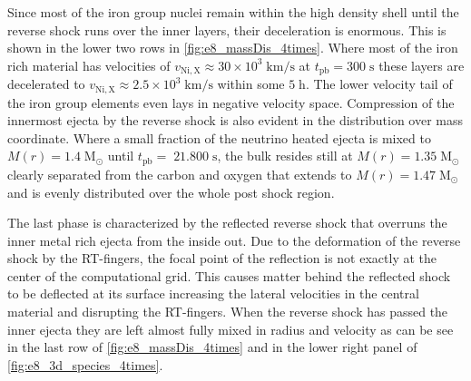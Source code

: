 \documentclass[fleqn,usenatbib]{mnras}
\begin{document}
Since most of the iron group nuclei remain within the high density shell until the reverse shock runs over the inner layers, their deceleration is enormous. This is shown in the lower two rows in \autoref{fig:e8_massDis_4times}. Where most of the iron rich material has velocities of $v_{\mathrm{Ni,X}}\approx 30\times10^3 \;\mathrm{km/s}$ at $t_{\mathrm{pb}}=300\;\mathrm{s}$ these layers are decelerated to $v_{\mathrm{Ni,X}}\approx 2.5\times 10^3\;\mathrm{km/s}$ within some $5 \;\mathrm{h}$. The lower velocity tail of the iron group elements even lays in negative velocity space. 
Compression of the innermost ejecta by the reverse shock is also evident in the distribution over mass coordinate. Where a small fraction of the neutrino heated ejecta is mixed to $M(r)=1.4\;\mathrm{M_{\odot}}$ until $t_{\mathrm{pb}}=\;21.800\;\mathrm{s}$, the bulk resides still at  $M(r)=1.35\;\mathrm{M_{\odot}}$ clearly separated from the carbon and oxygen that extends to $M(r)=1.47\;\mathrm{M_{\odot}}$ and is evenly distributed over the whole post shock region.

The last phase is characterized by the reflected reverse shock that overruns the inner metal rich ejecta from the inside out. Due to the deformation of the reverse shock by the RT-fingers, the focal point of the reflection is not exactly at the center of the computational grid. This causes matter behind the reflected shock to be deflected at its surface  increasing the lateral velocities in the central material and disrupting the RT-fingers. When the reverse shock has passed the inner ejecta they are left almost fully mixed in radius and velocity as can be see in the last row of \autoref{fig:e8_massDis_4times} and in the lower right panel of \autoref{fig:e8_3d_species_4times}.
\end{document}
